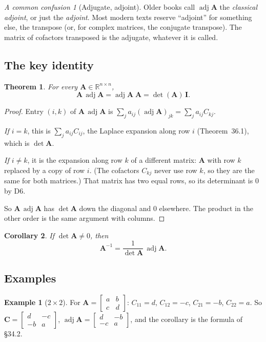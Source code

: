 \documentclass[11pt]{article}
\theoremstyle{plain}
\newtheorem{thm}{Theorem}[section]
\newtheorem{cor}[thm]{Corollary}
\theoremstyle{definition}
\newtheorem{ex}{Example}[section]
\theoremstyle{remark}
\newtheorem*{warn}{A common confusion}
\newcommand{\R}{\mathbb{R}}
\newcommand{\mt}[1]{\mathbf{#1}}
\DeclareMathOperator{\adj}{adj}
\begin{document}
\begin{warn}[Adjugate, adjoint]
Older books call $\adj\mt{A}$ the \emph{classical adjoint}, or just the
\emph{adjoint}. Most modern texts reserve ``adjoint'' for something else, the
transpose (or, for complex matrices, the conjugate transpose). The matrix of
cofactors transposed is the adjugate, whatever it is called.
\end{warn}

\subsection{The key identity}
\begin{thm}
\label{thm:adj}
For every $\mt{A}\in\R^{n\times n}$,
\[
  \mt{A}\,\adj\mt{A}=\adj\mt{A}\;\mt{A}=\det(\mt{A})\,\mt{I}.
\]
\end{thm}

\begin{proof}
Entry $(i,k)$ of $\mt{A}\,\adj\mt{A}$ is $\sum_j a_{ij}(\adj\mt{A})_{jk}=\sum_ja_{ij}C_{kj}$.

\emph{If $i=k$}, this is $\sum_ja_{ij}C_{ij}$, the Laplace expansion along row $i$
(Theorem~36.1), which is $\det\mt{A}$.

\emph{If $i\neq k$}, it is the expansion along row $k$ of a different matrix: $\mt{A}$
with row $k$ replaced by a copy of row $i$. (The cofactors $C_{kj}$ never use row
$k$, so they are the same for both matrices.) That matrix has two equal rows, so
its determinant is $0$ by D6.

So $\mt{A}\,\adj\mt{A}$ has $\det\mt{A}$ down the diagonal and $0$ elsewhere. The
product in the other order is the same argument with columns.
\end{proof}

\begin{cor}
If $\det\mt{A}\neq0$, then
\[
  \boxed{\;\mt{A}^{-1}=\frac{1}{\det\mt{A}}\,\adj\mt{A}.\;}
\]
\end{cor}

\subsection{Examples}
\begin{ex}[$2\times2$]
For $\mt{A}=\begin{bmatrix}a&b\\c&d\end{bmatrix}$: $C_{11}=d$, $C_{12}=-c$,
$C_{21}=-b$, $C_{22}=a$. So $\mt{C}=\begin{bmatrix}d&-c\\-b&a\end{bmatrix}$,
$\adj\mt{A}=\begin{bmatrix}d&-b\\-c&a\end{bmatrix}$, and the corollary is the
formula of \S34.2.
\end{ex}
\end{document}

